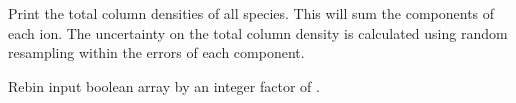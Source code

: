 \documentclass[letterpaper,10pt,english]{sphinxmanual}
\begin{document}

\begin{fulllineitems}
\label{\detokenize{api:output.print_total}}
Print the total column densities of all species. This will sum 
the components of each ion. The uncertainty on the total column density
is calculated using random resampling within the errors of each component.

\end{fulllineitems}


\begin{fulllineitems}
\label{\detokenize{api:output.rebin_bool_array}}
Rebin input boolean array  by an integer factor of .

\end{fulllineitems}

\end{document}
